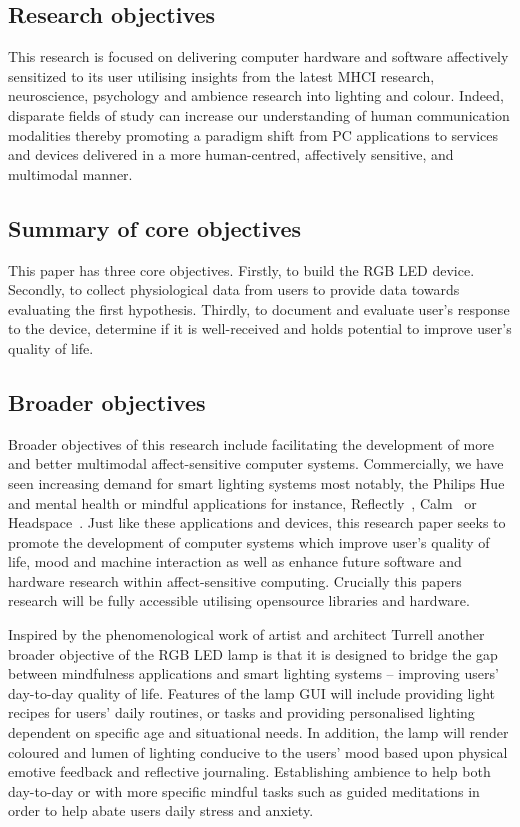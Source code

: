\documentclass{sigchi}
\begin{document}
\subsection{Research objectives}

This research is focused on delivering computer hardware and software affectively sensitized to its user utilising insights from the latest MHCI research, neuroscience, psychology and ambience research into lighting and colour. Indeed, disparate fields of study can increase our understanding of human communication modalities thereby promoting a paradigm shift from PC applications to services and devices delivered in a more human-centred, affectively sensitive, and multimodal manner. 

\subsection{Summary of core objectives}

This paper has three core objectives. Firstly, to build the RGB LED device. Secondly, to collect physiological data from users to provide data towards evaluating the first hypothesis. Thirdly, to document and evaluate user’s response to the device, determine if it is well-received and holds potential to improve user’s quality of life.

\subsection{Broader objectives}

Broader objectives of this research include facilitating the development of more and better multimodal affect-sensitive computer systems. Commercially, we have seen increasing demand for smart lighting systems most notably, the Philips Hue~\cite{Phillips01} and mental health or mindful applications for instance, Reflectly~\cite{Reflectly01}, Calm~\cite{Calm01} or Headspace~\cite{Headspace01}. Just like these applications and devices, this research paper seeks to promote the development of computer systems which improve user’s quality of life, mood and machine interaction as well as enhance future software and hardware research within affect-sensitive computing. Crucially this papers research will be fully accessible utilising opensource libraries and hardware. 

Inspired by the phenomenological work of artist and architect Turrell another broader objective of the RGB LED lamp is that it is designed to bridge the gap between mindfulness applications and smart lighting systems – improving users’ day-to-day quality of life. Features of the lamp GUI will include providing light recipes for users’ daily routines, or tasks and providing personalised lighting dependent on specific age and situational needs. In addition, the lamp will render coloured and lumen of lighting conducive to the users’ mood based upon physical emotive feedback and reflective journaling. Establishing ambience to help both day-to-day or with more specific mindful tasks such as guided meditations in order to help abate users daily stress and anxiety.
\end{document}
